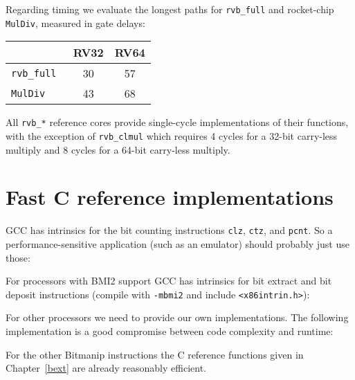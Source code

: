 Regarding timing we evaluate the longest paths for {\tt rvb\_full} and
rocket-chip {\tt MulDiv}, measured in gate delays:

\begin{center}
\begin{tabular}{lcc}
& RV32 & RV64 \\
\hline
\tt rvb\_full & 30 & 57 \\
\tt MulDiv & 43 & 68 \\
\end{tabular}
\end{center}

All {\tt rvb\_*} reference cores provide single-cycle implementations of their functions,
with the exception of {\tt rvb\_clmul} which requires 4 cycles for a 32-bit
carry-less multiply and 8 cycles for a 64-bit carry-less multiply.


\section{Fast C reference implementations}
\label{fastc}

GCC has intrinsics for the bit counting instructions {\tt clz}, {\tt ctz}, and
{\tt pcnt}.  So a performance-sensitive application (such as an emulator)
should probably just use those:



For processors with BMI2 support GCC has intrinsics for bit extract and bit
deposit instructions (compile with {\tt -mbmi2} and include {\tt <x86intrin.h>}):



For other processors we need to provide our own implementations. The following
implementation is a good compromise between code complexity and runtime:



For the other Bitmanip instructions the C reference functions given in Chapter~\ref{bext}
are already reasonably efficient.
